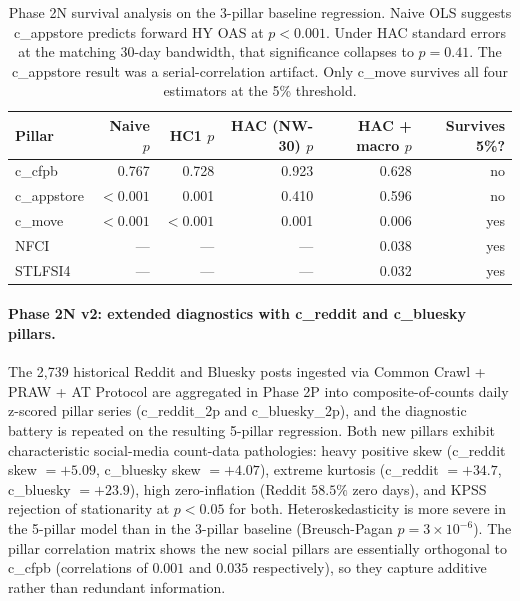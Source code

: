 \documentclass[11pt,a4paper]{article}
\begin{document}
\begin{table}[h]
\centering\footnotesize
\begin{tabular}{@{}lrrrrr@{}}
\toprule
\textbf{Pillar} & \textbf{Naive $p$} & \textbf{HC1 $p$} & \textbf{HAC (NW-30) $p$} & \textbf{HAC + macro $p$} & \textbf{Survives 5\%?} \\
\midrule
c\_cfpb     & 0.767      & 0.728   & 0.923   & 0.628   & no  \\
c\_appstore & ${<}0.001$ & 0.001   & 0.410   & 0.596   & no  \\
c\_move     & ${<}0.001$ & ${<}0.001$ & 0.001 & 0.006   & yes \\
NFCI        &      ---   &  ---    &  ---    & 0.038   & yes \\
STLFSI4     &      ---   &  ---    &  ---    & 0.032   & yes \\
\bottomrule
\end{tabular}
\caption{Phase 2N survival analysis on the 3-pillar baseline regression. Naive OLS suggests c\_appstore predicts forward HY OAS at $p < 0.001$. Under HAC standard errors at the matching 30-day bandwidth, that significance collapses to $p = 0.41$. The c\_appstore result was a serial-correlation artifact. Only c\_move survives all four estimators at the 5\% threshold.}
\label{tab:phase2N_survival}
\end{table}

\paragraph{Phase 2N v2: extended diagnostics with c\_reddit and c\_bluesky pillars.} The 2{,}739 historical Reddit and Bluesky posts ingested via Common Crawl + PRAW + AT Protocol are aggregated in Phase 2P into composite-of-counts daily z-scored pillar series (c\_reddit\_2p and c\_bluesky\_2p), and the diagnostic battery is repeated on the resulting 5-pillar regression. Both new pillars exhibit characteristic social-media count-data pathologies: heavy positive skew (c\_reddit skew $= +5.09$, c\_bluesky skew $= +4.07$), extreme kurtosis (c\_reddit $= +34.7$, c\_bluesky $= +23.9$), high zero-inflation (Reddit $58.5\%$ zero days), and KPSS rejection of stationarity at $p < 0.05$ for both. Heteroskedasticity is more severe in the 5-pillar model than in the 3-pillar baseline (Breusch-Pagan $p = 3 \times 10^{-6}$). The pillar correlation matrix shows the new social pillars are essentially orthogonal to c\_cfpb (correlations of $0.001$ and $0.035$ respectively), so they capture additive rather than redundant information.
\end{document}
